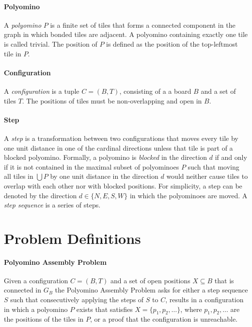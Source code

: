 \paragraph{Polyomino} A \emph{polyomino} $P$ is a finite set of tiles that forms a connected component in the graph in which bonded tiles are adjacent. A polyomino containing exactly one tile is called trivial. The position of $P$ is defined as the position of the top-leftmost tile in $P$.

\paragraph{Configuration} A \emph{configuration} is a tuple $C = (B, T)$, consisting of a a board $B$ and a set of tiles $T$. The positions of tiles must be non-overlapping and open in $B$.

\paragraph{Step} A \emph{step} is a transformation between two configurations that moves every tile by one unit distance in one of the cardinal directions unless that tile is part of a blocked polyomino.
Formally, a polyomino is \emph{blocked} in the direction $d$ if and only if it is not contained in the maximal subset of polyominoes $P$ such that moving all tiles in $\bigcup P$ by one unit distance in the direction $d$ would neither cause tiles to overlap with each other nor with blocked positions. For simplicity, a step can be denoted by the direction $d \in \{N, E, S, W\}$ in which the polyominoes are moved. A \emph{step sequence} is a series of steps.

\section{Problem Definitions}

\paragraph{Polyomino Assembly Problem}
Given a configuration $C= (B, T)$ and a set of open positions $X \subseteq B$ that is connected in $G_{B}$ the Polyomino Assembly Problem asks for either a step sequence $S$ such that consecutively applying the steps of $S$ to $C$, results in a configuration in which a polyomino $P$ exists that satisfies $X = \{p_{1}, p_{2},\ldots \}$, where $p_{1}, p_{2},\ldots$ are the positions of the tiles in $P$, or a proof that the configuration is unreachable.

